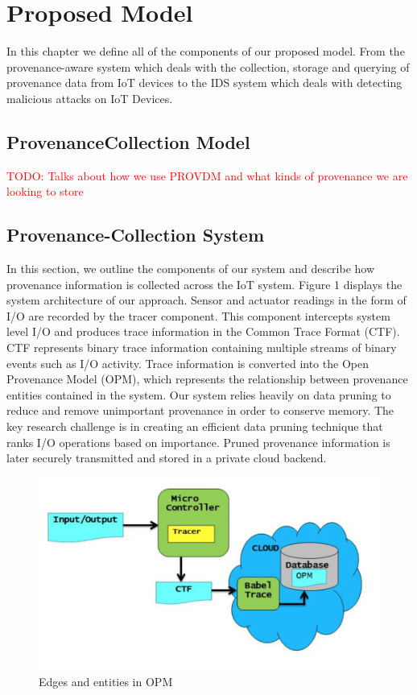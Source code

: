 
\chapter{Proposed Model}

In this chapter we define all of the components of our proposed model. From the provenance-aware system which deals with the collection, storage and querying of provenance data from IoT devices to the  IDS system which deals with detecting malicious attacks on IoT Devices.

\section{Provenance\-Collection Model}

\textcolor{red}{TODO: Talks about how we use PROV\-DM and what kinds of provenance we are looking to store}

\section{Provenance-Collection System}

In this section, we outline the components of our system and describe how provenance information is collected across the IoT system. Figure 1 displays the system architecture of our approach. Sensor and actuator readings in the form of I/O are recorded by the tracer component. This component intercepts system level I/O and produces trace information in the Common Trace Format (CTF). CTF represents binary trace information containing multiple streams of binary events such as I/O activity. Trace information is converted into the Open Provenance Model (OPM), which represents the relationship between provenance entities contained in the system. Our system relies heavily on data pruning to reduce and remove unimportant provenance in order to conserve memory. The key research challenge is in creating an efficient data pruning technique that ranks I/O operations based on importance. Pruned provenance information is later securely transmitted and stored in a private cloud backend.

\begin{figure}[h]
\begin{center}

\includegraphics{architecture.PNG}    
\end{center}
\caption{Edges and entities in OPM}
\label{autom}
\end{figure}

